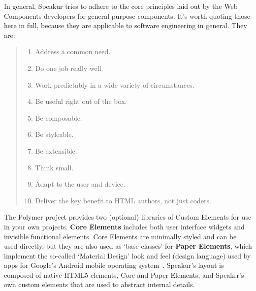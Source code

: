 In general, Speakur tries to adhere to the core principles laid out by the 
Web Components developers 
for general purpose components. 
It's worth quoting those here in full, 
because they are applicable to software engineering in general. They are:
\label{sec:wcprinciples}
\begin{quote}
\begin{enumerate}
\item Address a common need.\label{wcp:commonneed}
\item Do one job really well.\label{wcp:onejob}
\item Work predictably in a wide variety of circumstances.\label{wcp:predicatable}
\item Be useful right out of the box.\label{wcp:useful}
\item Be composable.\label{wcp:composable}
\item Be styleable.\label{wcp:stylable}
\item Be extensible.\label{wcp:extensible}
\item Think small.\label{wcp:thinksmall}
\item Adapt to the user and device.\label{wcp:adaptable}
\item Deliver the key benefit to HTML authors, not just coders.\label{wcp:htmlauthors}
~\cite{webcomponentscontributors2014}
\end{enumerate}
\end{quote}


The Polymer project provides two (optional) libraries of Custom Elements for use in your own projects. 
\textbf{Core Elements} includes both user interface
widgets and invisible functional elements.
Core Elements are minimally styled and can be used directly, 
but they are also used as `base classes' for 
\textbf{Paper Elements}, 
which implement the so-called `Material Design' look and feel (design language) used by apps for Google's Android mobile operating system~\cite{imura2015}.
Speakur's layout is composed of native HTML5 elements, 
Core and Paper Elements, 
and Speaker's own custom elements that are used to abstract internal details.

